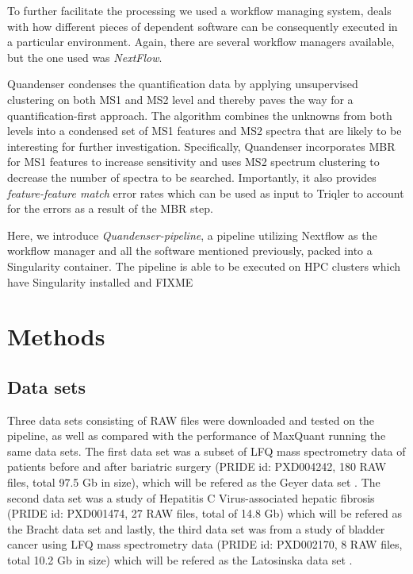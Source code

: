 \documentclass[11pt]{article}
\begin{document}
To further facilitate the processing we used a workflow managing system, deals with how different pieces of dependent software can be consequently executed in a particular environment. Again, there are several workflow managers available, but the one used was \textit{NextFlow}\cite{di2017nextflow}.

Quandenser condenses the quantification data by applying unsupervised clustering on both MS1 and MS2 level and thereby paves the way for a quantification-first approach. The algorithm combines the unknowns from both levels into a condensed set of MS1 features and MS2 spectra that are likely to be interesting for further investigation. Specifically, Quandenser incorporates MBR for MS1 features to increase sensitivity and uses MS2 spectrum clustering to decrease the number of spectra to be searched. Importantly, it also provides {\em feature-feature match} error rates which can be used as input to Triqler to account for the errors as a result of the MBR step.

Here, we introduce \textit{Quandenser-pipeline}, a pipeline utilizing Nextflow as the workflow manager and all the software mentioned previously, packed into a Singularity container. The pipeline is able to be executed on HPC clusters which have Singularity installed and FIXME

\section*{Methods}

\subsection*{Data sets}
Three data sets consisting of RAW files were downloaded and tested on the pipeline, as well as compared with the performance of MaxQuant running the same data sets. The first data set was a subset of LFQ mass spectrometry data of patients before and after bariatric surgery (PRIDE id: PXD004242, 180 RAW files, total 97.5 Gb in size), which will be refered as the Geyer data set \cite{geyer2016bartric}. The second data set was a study of Hepatitis C Virus-associated hepatic fibrosis (PRIDE id: PXD001474, 27 RAW files, total of 14.8 Gb) which will be refered as the Bracht data set and lastly, the third data set was from a study of bladder cancer using LFQ mass spectrometry data (PRIDE id: PXD002170, 8 RAW files, total 10.2 Gb in size) which will be refered as the Latosinska data set \cite{bracht2015analysis} \cite{latosinska2015comparative}.
\end{document}
